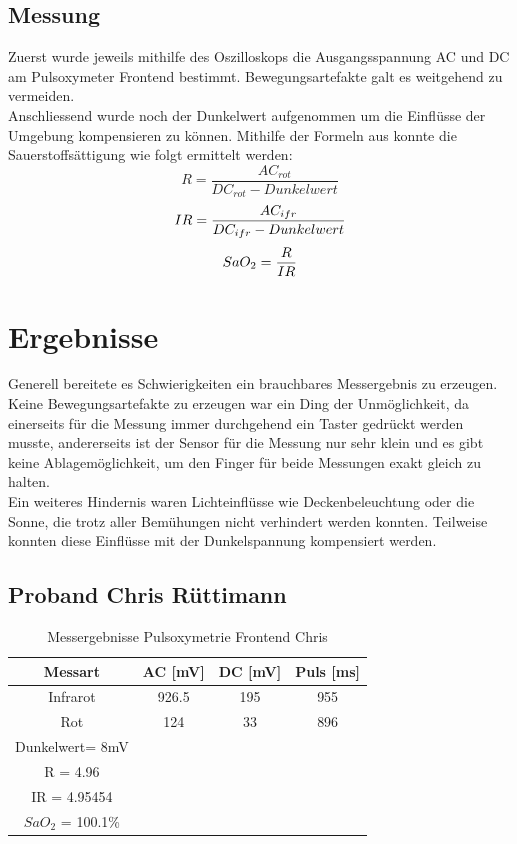 \documentclass[11pt]{scrartcl}
\begin{document}
    \subsection{Messung}
    Zuerst wurde jeweils mithilfe des Oszilloskops die Ausgangsspannung AC und DC am Pulsoxymeter Frontend bestimmt.
    Bewegungsartefakte galt es weitgehend zu vermeiden.\\
    Anschliessend wurde noch der Dunkelwert aufgenommen um die Einflüsse der Umgebung kompensieren zu können.
    Mithilfe der Formeln aus \cite{Pulsoxymetrie} konnte die Sauerstoffsättigung wie folgt ermittelt werden:
    \begin{equation}
        R = \frac{AC_{rot}}{DC_{rot} - Dunkelwert} 
    \end{equation}
    \begin{equation}
        IR = \frac{AC_{ifr}}{DC_{ifr} - Dunkelwert} \\
    \end{equation}
    \begin{equation}
        SaO_{2} = \frac{R}{IR} \\
    \end{equation}

    \section{Ergebnisse}
    Generell bereitete es Schwierigkeiten ein brauchbares Messergebnis zu erzeugen.
    Keine Bewegungsartefakte zu erzeugen war ein Ding der Unmöglichkeit, da einerseits für die Messung immer
    durchgehend ein Taster gedrückt werden musste, andererseits ist der Sensor für die Messung nur sehr klein und es
    gibt keine Ablagemöglichkeit, um den Finger für beide Messungen exakt gleich zu halten.\\
    Ein weiteres Hindernis waren Lichteinflüsse wie Deckenbeleuchtung oder die Sonne, die trotz aller
    Bemühungen nicht verhindert werden konnten.
    Teilweise konnten diese Einflüsse mit der Dunkelspannung kompensiert werden.

    \subsection{Proband Chris Rüttimann}
    \begin {table} [h]
    \centering
    \caption{Messergebnisse Pulsoxymetrie Frontend Chris}
    \label{tab:chris_frontend}
    \begin{tabular}{c|c c c}
        Messart & AC [mV] & DC [mV] & Puls [ms] \\
        \hline
        Infrarot & 926.5 & 195 & 955 \\
        Rot & 124 & 33 & 896 \\
        \hline
        Dunkelwert= 8mV \\
        R = 4.96\\
        IR = 4.95454\\
        $SaO_{2}$ = 100.1\%
    \end{tabular}  
    \end{table}
\end{document}
